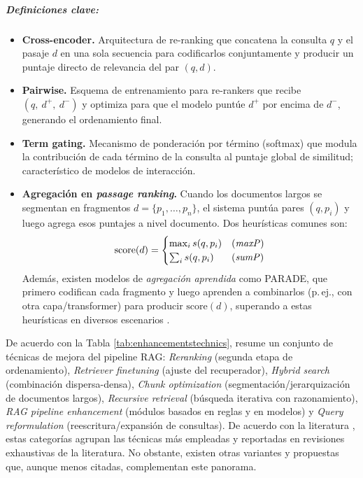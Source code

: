 \subparagraph{Definiciones clave:}
\begin{itemize}
    \item \textbf{Cross-encoder.} Arquitectura de re-ranking que concatena la consulta $q$ y el pasaje $d$ en una sola secuencia para codificarlos conjuntamente y producir un puntaje directo de relevancia del par $(q,d)$.
    \item \textbf{Pairwise.} Esquema de entrenamiento para re-rankers que recibe $(q,\ d^{+},\ d^{-})$ y optimiza para que el modelo puntúe $d^{+}$ por encima de $d^{-}$, generando el ordenamiento final.
    \item \textbf{Term gating.} Mecanismo de ponderación por término (softmax) que modula la contribución de cada término de la consulta al puntaje global de similitud; característico de modelos de interacción.
    \item \textbf{Agregación en \textit{passage ranking}.} 
    Cuando los documentos largos se segmentan en fragmentos \(d=\{p_1,\dots,p_n\}\), el sistema puntúa pares \((q,p_i)\) y luego agrega esos puntajes a nivel documento. 
    Dos heurísticas comunes son:
      \[
      \mathrm{score}(d)=
      \begin{cases}
      \max_{i} s(q,p_i) & \text{(\textit{maxP})}\\
      \sum_{i} s(q,p_i) & \text{(\textit{sumP})}
      \end{cases}
      \]
    Además, existen modelos de \textit{agregación aprendida} como \textsc{PARADE}, que primero codifican cada fragmento y luego aprenden a combinarlos (p.\,ej., con otra capa/transformer) para producir \(\mathrm{score}(d)\), superando a estas heurísticas en diversos escenarios \parencite{fan2021pretraining}.
\end{itemize}

\noindent De acuerdo con la Tabla \ref{tab:enhancementstechnics}, resume un conjunto de técnicas de mejora del pipeline RAG:
 \textit{Reranking} (segunda etapa de ordenamiento), \textit{Retriever finetuning} (ajuste del recuperador), \textit{Hybrid search} (combinación dispersa-densa), 
 \textit{Chunk optimization} (segmentación/jerarquización de documentos largos), \textit{Recursive retrieval} (búsqueda iterativa con razonamiento), 
 \textit{RAG pipeline enhancement} (módulos basados en reglas y en modelos) y \textit{Query reformulation} (reescritura/expansión de consultas). 
De acuerdo con la literatura \parencite{hambarde2023ir,fan2021pretraining,han2024rag,wu2025ragSurvey}, estas categorías agrupan las técnicas más empleadas y reportadas en revisiones exhaustivas de la literatura. No obstante,
 existen otras variantes y propuestas que, aunque menos citadas, complementan este panorama.

